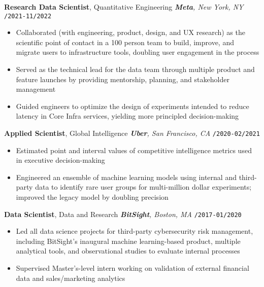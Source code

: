 \documentclass[10pt,english]{report}
\newcommand{\blockbreak} {
    \vspace{3mm}
}
\begin{document}
\blockbreak

\textbf{Research Data Scientist}, Quantitative Engineering \hfill \textit{\textbf{Meta}, New York, NY} \texttt{/2021-11/2022}
\begin{itemize}
    \item Collaborated (with engineering, product, design, and UX research) as the scientific point of contact in a 100 person team to build, improve, and migrate users to infrastructure tools, doubling user engagement in the process
    \item Served as the technical lead for the data team through multiple product and feature launches by providing mentorship, planning, and stakeholder management
    \item Guided engineers to optimize the design of experiments intended to reduce latency in Core Infra services, yielding more principled decision-making
\end{itemize}

\blockbreak

\textbf{Applied Scientist}, Global Intelligence \hfill \textit{\textbf{Uber}, San Francisco, CA} \texttt{/2020-02/2021}
\begin{itemize}
    \item Estimated point and interval values of competitive intelligence metrics used in executive decision-making
    \item Engineered an ensemble of machine learning models using internal and third-party data to identify rare user groups for multi-million dollar experiments; improved the legacy model by doubling precision
\end{itemize}

\blockbreak

\textbf{Data Scientist}, Data and Research \hfill \textit{\textbf{BitSight}, Boston, MA} \texttt{/2017-01/2020}
\begin{itemize}
    \item Led all data science projects for third-party cybersecurity risk management, including BitSight's inaugural machine learning-based product, multiple analytical tools, and observational studies to evaluate internal processes
    \item Supervised Master's-level intern working on validation of external financial data and sales/marketing analytics
\end{itemize}
\end{document}
